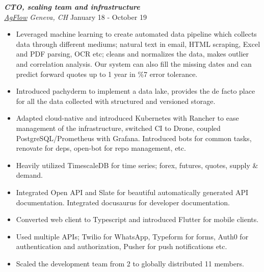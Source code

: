\documentclass[line, margin]{res}
\begin{document}
\begin{resume}
\begin{itemize}
\end{itemize}


{\sl \textbf{CTO, scaling team and infrastructure} \\ \href{http://www.agflow.com}{AgFlow} Geneva, CH} \hfill January 18 - October 19 \\
\vspace{-0.3cm}
\begin{itemize}
  \item Leveraged machine learning to create automated data pipeline which collects data through different mediums; natural text in email, HTML scraping, Excel and PDF parsing, OCR etc; cleans and normalizes the data, makes outlier and correlation analysis. Our system can also fill the missing dates and can predict forward quotes up to 1 year in \%7 error tolerance.
  \item Introduced pachyderm to implement a data lake, provides the de facto place for all the data collected with structured and versioned storage.
  \item Adapted cloud-native and introduced Kubernetes with Rancher to ease management of the infrastructure, switched CI to Drone, coupled PostgreSQL/Prometheus with Grafana. Introduced bots for common tasks, renovate for deps, open-bot for repo management, etc.
  \item Heavily utilized TimescaleDB for time series; forex, futures, quotes, supply \& demand.
  \item Integrated Open API and Slate for beautiful automatically generated API documentation. Integrated docusaurus for developer documentation.
  \item Converted web client to Typescript and introduced Flutter for mobile clients. 
  \item Used multiple APIs; Twilio for WhatsApp, Typeform for forms, Auth0 for authentication and authorization, Pusher for push notifications etc.
  \item Scaled the development team from 2 to globally distributed 11 members.
  
\end{itemize}


\end{resume}
\end{document}
